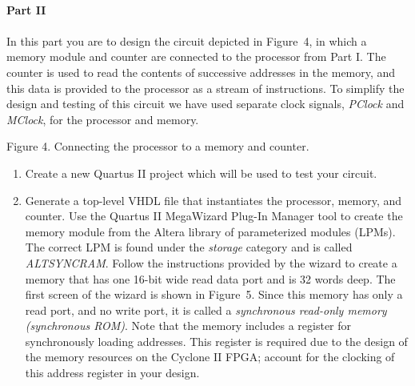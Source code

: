 \documentclass[epsfig,10pt,fullpage]{article}
\begin{document}
~\\
\noindent
{\bf Part II}
~\\
~\\
\noindent
In this part you are to design the circuit depicted in Figure~4, in which a 
memory module and counter are connected to the processor from Part I. The
counter is used to read the contents of successive addresses in the memory, and
this data is provided to the processor as a stream of instructions. To simplify the
design and testing of this circuit we have used separate clock signals, {\it PClock} 
and {\it MClock}, for the processor and memory.
\begin{figure}[H]
\scriptsize
\centerline{
\hbox{}}
\end{figure}
\centerline{Figure 4. Connecting the processor to a memory and counter.}
\begin{enumerate}
\item Create a new Quartus II project which will be used to test your circuit.
\item Generate a top-level VHDL file that instantiates the processor, memory, and
counter. Use the Quartus II MegaWizard Plug-In Manager tool to create the memory 
module from the Altera library of parameterized modules (LPMs). The correct
LPM is found under the {\it storage} category and is called {\it ALTSYNCRAM}. Follow the
instructions provided by the wizard to create a memory that has one 16-bit wide read data port
and is 32 words deep. The first screen of the wizard is shown in Figure~5. Since
this memory has only a read port, and no write port, it is called a 
{\it synchronous read-only memory (synchronous ROM)}. 
Note that the memory includes a register for synchronously loading addresses. This 
register is required
due to the design of the memory resources on the Cyclone II FPGA; account for
the clocking of this address register in your design.


\end{enumerate}
\end{document}
